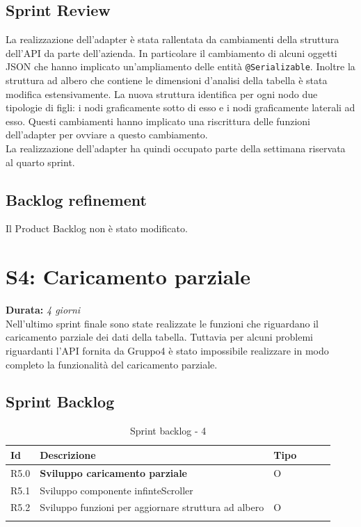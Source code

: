\subsection{Sprint Review}
La realizzazione dell'adapter è stata rallentata da cambiamenti della struttura dell'API da parte dell'azienda. In particolare il cambiamento di alcuni oggetti JSON che hanno implicato un'ampliamento delle entità \verb|@Serializable|. Inoltre la struttura ad albero che contiene le dimensioni d'analisi della tabella è stata modifica estensivamente. La nuova struttura identifica per ogni nodo due tipologie di figli: i nodi graficamente sotto di esso e i nodi graficamente laterali ad esso. Questi cambiamenti hanno implicato una riscrittura delle funzioni dell'adapter per ovviare a questo cambiamento. \\
La realizzazione dell'adapter ha quindi occupato parte della settimana riservata al quarto sprint.

\subsection{Backlog refinement}
Il Product Backlog non è stato modificato.

\newpage

\section{S4: Caricamento parziale}
\textbf{Durata:} \textit{4 giorni} \\
Nell'ultimo sprint finale sono state realizzate le funzioni che riguardano il caricamento parziale dei dati della tabella. Tuttavia per alcuni problemi riguardanti l'API fornita da Gruppo4 è stato impossibile realizzare in modo completo la funzionalità del caricamento parziale.

\subsection{Sprint Backlog}
\begin{longtable} {
		|>{}p{10mm}| 
		|>{}p{90mm}|
		|>{}p{15mm}|
		|>{}p{15mm}|
		|>{}p{15mm}|
		>{}p{0mm}}
	\hline
	\textbf{Id} & \textbf{Descrizione} & \textbf{Tipo} \\ \hline
	R5.0 & \textbf{Sviluppo caricamento parziale}  & O  \\ \hline
	R5.1   & Sviluppo componente infinteScroller &      \\ \hline
	R5.2   & Sviluppo funzioni per aggiornare struttura ad albero & O     \\ \hline
\caption{Sprint backlog - 4}
\end{longtable}

